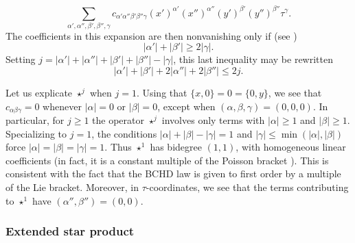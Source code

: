 \begin{equation*}
  \sum_{\alpha ', \alpha '', \beta ', \beta '' , \gamma }
  c_{\alpha ' \alpha '' \beta ' \beta '' \gamma }
  (x ' ) ^{\alpha ' }
  (x '') ^{\alpha ''}
  (y ') ^{\beta '}
  (y '' ) ^{\beta ''}
  \tau^\gamma.
\end{equation*}
The coefficients in this expansion are then nonvanishing only if (see \cite[Lemma 9.13]{2020arXiv201202187N})
\begin{equation*}
  |\alpha '| + |\beta '| \geq 2 |\gamma|.
\end{equation*}
Setting $j = |\alpha'| + |\alpha ''| + |\beta '| + |\beta ''| - |\gamma|$, this last inequality may be rewritten
\begin{equation}\label{eq:alpha-refined-support-condition}
  |\alpha '| + |\beta ' | + 2 | \alpha '' | + 2 |\beta ''| \leq 2 j.
\end{equation}

\begin{example}\label{exa:star1-structure}
  Let us explicate $\star^j$ when $j=1$.  Using that $\{x,0\}=0=\{0,y\}$, we see that $c_{\alpha\beta\gamma}=0$ whenever $|\alpha|=0$ or $|\beta|=0$, except when $(\alpha,\beta,\gamma)=(0,0,0)$.  In particular, for $j\ge 1$ the operator $\star^j$ involves only terms with $|\alpha|\ge 1$ and $|\beta|\ge 1$.  Specializing to $j=1$, the conditions $|\alpha|+|\beta|-|\gamma|=1$ and $|\gamma|\le \min(|\alpha|,|\beta|)$ force $|\alpha|=|\beta|=|\gamma|=1$.  Thus $\star^1$ has bidegree $(1,1)$, with homogeneous linear coefficients (in fact, it is a constant multiple of the Poisson bracket \cite{gutt1983explicit}).  This is consistent with the fact that the BCHD law is given to first order by a multiple of the Lie bracket.  Moreover, in $\tau$-coordinates, we see that the terms contributing to $\star^1$ have $(\alpha '', \beta '') =(0,0)$.
\end{example}

\subsubsection{Extended star product}

